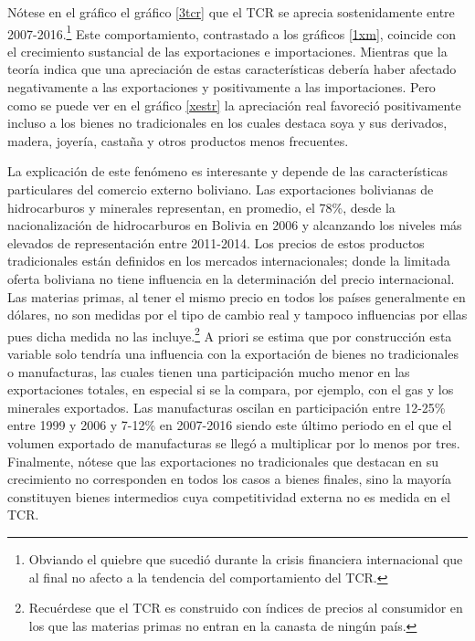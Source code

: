 \documentclass[12pt,letterpaper]{article}
\begin{document}
Nótese en el gráfico el gráfico \ref{3tcr} que el TCR se aprecia sostenidamente entre 2007-2016.\footnote{Obviando el quiebre que sucedió durante la crisis financiera internacional que al final no afecto a la tendencia del comportamiento del TCR.} Este comportamiento, contrastado a los gráficos \ref{1xm}, coincide con el crecimiento sustancial de las exportaciones e importaciones. Mientras que la teoría indica que una apreciación de estas características debería haber afectado negativamente a las exportaciones y positivamente a las importaciones. Pero como se puede ver en el gráfico \ref{xestr} la apreciación real favoreció positivamente incluso a los bienes no tradicionales en los cuales destaca soya y sus derivados, madera, joyería, castaña y otros productos menos frecuentes.

La explicación de este fenómeno es interesante y depende de las características particulares del comercio externo boliviano. Las exportaciones bolivianas de hidrocarburos y minerales representan, en promedio, el 78\%, desde la nacionalización de hidrocarburos en Bolivia en 2006 y alcanzando los niveles más elevados de representación entre 2011-2014. Los precios de estos productos tradicionales están definidos en los mercados internacionales; donde la limitada oferta boliviana no tiene influencia en la determinación del precio internacional. Las materias primas, al tener el mismo precio en todos los países generalmente en dólares, no son medidas por el tipo de cambio real y tampoco influencias por ellas pues dicha medida no las incluye.\footnote{Recuérdese que el TCR es construido con índices de precios al consumidor en los que las materias primas no entran en la canasta de ningún país.} A priori se estima que por construcción esta variable solo tendría una influencia con la exportación de bienes no tradicionales o manufacturas, las cuales tienen una participación mucho menor en las exportaciones totales, en especial si se la compara, por ejemplo, con el gas y los minerales exportados. Las manufacturas oscilan en participación entre 12-25\% entre 1999 y 2006 y 7-12\% en 2007-2016 siendo este último periodo en el que el volumen exportado de manufacturas se llegó a multiplicar por lo menos por tres. Finalmente, nótese que las exportaciones no tradicionales que destacan en su crecimiento no corresponden en todos los casos a bienes finales, sino la mayoría constituyen bienes intermedios cuya competitividad externa no es medida en el TCR.
\end{document}
